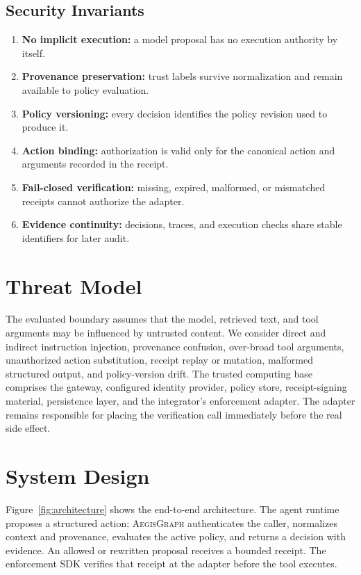 \documentclass[10pt,twocolumn]{article}
\newcommand{\system}{\textsc{AegisGraph}\xspace}
\begin{document}
\subsection{Security Invariants}
\begin{enumerate}
  \item \textbf{No implicit execution:} a model proposal has no execution authority by itself.
  \item \textbf{Provenance preservation:} trust labels survive normalization and remain available to policy evaluation.
  \item \textbf{Policy versioning:} every decision identifies the policy revision used to produce it.
  \item \textbf{Action binding:} authorization is valid only for the canonical action and arguments recorded in the receipt.
  \item \textbf{Fail-closed verification:} missing, expired, malformed, or mismatched receipts cannot authorize the adapter.
  \item \textbf{Evidence continuity:} decisions, traces, and execution checks share stable identifiers for later audit.
\end{enumerate}

\section{Threat Model}
The evaluated boundary assumes that the model, retrieved text, and tool arguments may be influenced by untrusted content. We consider direct and indirect instruction injection, provenance confusion, over-broad tool arguments, unauthorized action substitution, receipt replay or mutation, malformed structured output, and policy-version drift. The trusted computing base comprises the gateway, configured identity provider, policy store, receipt-signing material, persistence layer, and the integrator's enforcement adapter. The adapter remains responsible for placing the verification call immediately before the real side effect.

\section{System Design}
Figure~\ref{fig:architecture} shows the end-to-end architecture. The agent runtime proposes a structured action; \system authenticates the caller, normalizes context and provenance, evaluates the active policy, and returns a decision with evidence. An allowed or rewritten proposal receives a bounded receipt. The enforcement SDK verifies that receipt at the adapter before the tool executes.
\end{document}
